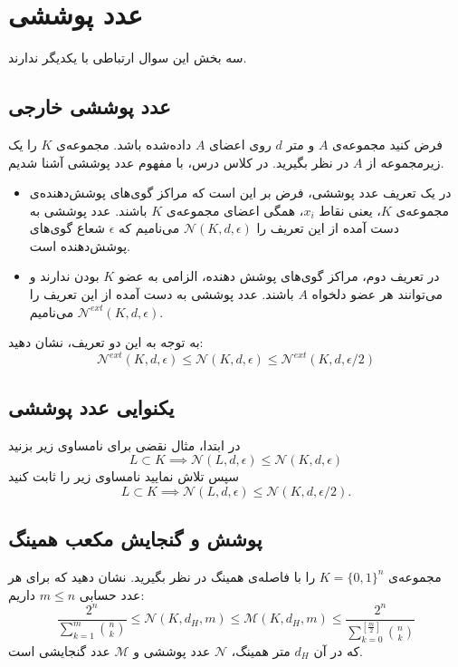 \section
[لم مازارت]
{عدد پوششی}
سه بخش این سوال ارتباطی با یکدیگر ندارند.
\subsection{عدد پوششی خارجی}
فرض کنید مجموعه‌ی 
$A$
و متر $d$ روی اعضای $A$ داده‌شده باشد. مجموعه‌ی 
$K$
را یک زیرمجموعه‌ از
$A$
در نظر بگیرید. در کلاس درس، با مفهوم عدد پوششی آشنا شدیم.

\begin{itemize}
\item
در یک تعریف عدد پوششی، فرض بر این است که مراکز گوی‌های پوشش‌دهنده‌ی مجموعه‌ی 
$K$،
 یعنی نقاط
$x_i$،
همگی اعضای مجموعه‌ی 
$K$
باشند. عدد پوششی به دست آمده از این تعریف را
$\mathcal{N}(K, d, \epsilon)$
می‌نامیم که 
$\epsilon$
شعاع گوی‌های پوشش‌دهنده است.
\item
در تعریف دوم، مراکز گوی‌های پوشش دهنده، الزامی به عضو $K$ بودن ندارند و می‌توانند هر عضو دلخواه $A$ باشند. عدد پوششی به دست آمده از این تعریف را 
$\mathcal{N}^{ext}(K, d, \epsilon)$
می‌نامیم.
\end{itemize}

به توجه به این دو تعریف، نشان دهید:
$$\mathcal{N}^{ext}(K, d, \epsilon) \leq \mathcal{N}(K, d, \epsilon) \leq \mathcal{N}^{ext}(K, d, \epsilon/2)$$

\subsection{یکنوایی عدد پوششی}
در ابتدا، مثال نقضی برای نامساوی زیر بزنید
$$L \subset K \implies \mathcal{N}(L, d, \epsilon) \leq \mathcal{N}(K, d, \epsilon)$$
سپس تلاش نمایید نامساوی زیر را ثابت کنید
$$L \subset K \implies \mathcal{N}(L, d, \epsilon) \leq \mathcal{N}(K, d, \epsilon/2).$$

\subsection
[مکعب همینگ]
{پوشش و گنجایش مکعب همینگ}
مجموعه‌ی
$K = \{0, 1\}^n$
را با فاصله‌ی همینگ در نظر بگیرید.  نشان دهید که برای هر عدد حسابی
$m \leq n$
داریم:
$$\frac{2^n}{\sum_{k = 1}^{m} {n \choose k}} \leq \mathcal{N}(K, d_H, m) \leq \mathcal{M}(K, d_H, m) \leq \frac{2^n}{\sum_{k = 0}^{[\frac{m}{2}]} {n \choose k}}$$
که در آن $d_H$ متر همینگ، 
$\mathcal{N}$
عدد پوششی و 
$\mathcal{M}$
عدد گنجایشی است.
